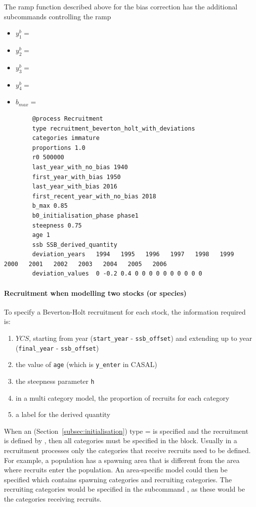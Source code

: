 The ramp function described above for the bias correction has the additional subcommands controlling the ramp

\begin{itemize}
	\item $y_1^b = $ 
	\item $y_2^b = $ 
	\item $y_3^b = $ 
	\item $y_4^b = $ 
	\item $b_{max} = $ 
\end{itemize}

{\small{\begin{verbatim}
		@process Recruitment
		type recruitment_beverton_holt_with_deviations
		categories immature
		proportions 1.0
		r0 500000
		last_year_with_no_bias 1940
		first_year_with_bias 1950
		last_year_with_bias 2016
		first_recent_year_with_no_bias 2018
		b_max 0.85
		b0_initialisation_phase phase1
		steepness 0.75
		age 1
		ssb SSB_derived_quantity
		deviation_years   1994   1995   1996   1997   1998   1999   2000   2001   2002   2003   2004   2005   2006
		deviation_values  0 -0.2 0.4 0 0 0 0 0 0 0 0 0 0
\end{verbatim}}}

\paragraph*{Recruitment when modelling two stocks (or species)}

To specify a Beverton-Holt recruitment for each stock, the information required is:

\begin{enumerate}
	\item $YCS$, starting from year (\texttt{start\_year} - \texttt{ssb\_offset}) and extending up to year (\texttt{final\_year} - \texttt{ssb\_offset})
	\item the value of \texttt{age} (which is \texttt{y\_enter} in CASAL)
	\item the steepness parameter \texttt{h}
	\item in a multi category model, the proportion of recruits for each category
	\item a label for the derived quantity
\end{enumerate}

When an  (Section~\ref{subsec:initialisation}) type =  is specified and the recruitment is defined by , then all categories must be specified in the  block. Usually in a recruitment processes only the categories that receive recruits need to be defined. For example, a population has a spawning area that is different from the area where recruits enter the population. An area-specific model could then be specified which contains spawning categories and recruiting categories. The recruiting categories would be specified in the subcommand , as these would be the categories receiving recruits.

